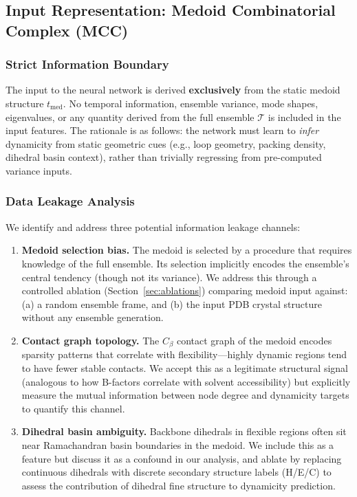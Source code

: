 \documentclass{article}
\begin{document}
\subsection{Input Representation: Medoid Combinatorial Complex (MCC)}

\subsubsection{Strict Information Boundary}
The input to the neural network is derived \textbf{exclusively} from the static medoid structure $t_{\text{med}}$. No temporal information, ensemble variance, mode shapes, eigenvalues, or any quantity derived from the full ensemble $\mathcal{T}$ is included in the input features. The rationale is as follows: the network must learn to \emph{infer} dynamicity from static geometric cues (e.g., loop geometry, packing density, dihedral basin context), rather than trivially regressing from pre-computed variance inputs.

\subsubsection{Data Leakage Analysis}
We identify and address three potential information leakage channels:

\begin{enumerate}
    \item \textbf{Medoid selection bias.} The medoid is selected by a procedure that requires knowledge of the full ensemble. Its selection implicitly encodes the ensemble's central tendency (though not its variance). We address this through a controlled ablation (Section~\ref{sec:ablations}) comparing medoid input against: (a) a random ensemble frame, and (b) the input PDB crystal structure without any ensemble generation.
    
    \item \textbf{Contact graph topology.} The $C_\beta$ contact graph of the medoid encodes sparsity patterns that correlate with flexibility---highly dynamic regions tend to have fewer stable contacts. We accept this as a legitimate structural signal (analogous to how B-factors correlate with solvent accessibility) but explicitly measure the mutual information between node degree and dynamicity targets to quantify this channel.
    
    \item \textbf{Dihedral basin ambiguity.} Backbone dihedrals in flexible regions often sit near Ramachandran basin boundaries in the medoid. We include this as a feature but discuss it as a confound in our analysis, and ablate by replacing continuous dihedrals with discrete secondary structure labels (H/E/C) to assess the contribution of dihedral fine structure to dynamicity prediction.
\end{enumerate}
\end{document}
